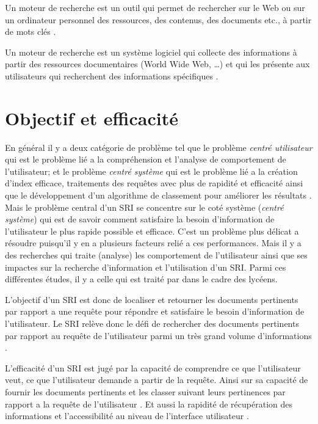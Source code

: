 \begin{definition}
	Un moteur de recherche est un outil qui permet de rechercher sur le Web ou sur un ordinateur personnel des ressources, des contenus, des documents etc., à partir de mots clés \citep{jdn-moteur-de-recherche}.
\end{definition}

\begin{definition}
	Un moteur de recherche est un système logiciel qui collecte des informations à partir des ressources documentaires (World Wide Web, \dots) et qui les présente aux utilisateurs qui recherchent des informations spécifiques \citep{mdn-search-engine}.
\end{definition}

\section{Objectif et efficacité}
En général il y a deux catégorie de problème tel que le problème \textit{centré utilisateur} qui est le problème lié a la compréhension et l'analyse de comportement de l'utilisateur; et le problème \textit{centré système} qui est le problème lié a la création d'index efficace, traitements des requêtes avec plus de rapidité et efficacité ainsi que le développement d'un algorithme de classement pour améliorer les résultats \citep{modern-ir}. Mais le problème central d'un SRI se concentre sur le coté système (\textit{centré système}) qui est de savoir comment satisfaire la besoin d'information de l'utilisateur le plus rapide possible et efficace. C'est un problème plus délicat a résoudre puisqu'il y en a plusieurs facteurs relié a ces performances. Mais il y a des recherches qui traite (analyse) les comportement de l'utilisateur ainsi que ses impactes sur la recherche d’information et l'utilisation d'un SRI. Parmi ces différentes études, il y a celle qui est traité par \citeauthor{ri-sur-le-web} \citep{ri-sur-le-web} dans le cadre des lycéens.

L'objectif d'un SRI est donc de localiser et retourner les documents pertinents par rapport a une requête pour répondre et satisfaire le besoin d'information de l'utilisateur. Le SRI relève donc le défi de rechercher des documents pertinents par rapport au requête de l'utilisateur parmi un très grand volume d'informations \citep{amelioration-ri-approche-semantique}.

L'efficacité d'un SRI est jugé par la capacité de comprendre ce que l'utilisateur veut, ce que l'utilisateur demande a partir de la requête. Ainsi sur sa capacité de fournir les documents pertinents et les classer suivant leurs pertinences par rapport a la requête de l'utilisateur \citep{vsm}. Et aussi la rapidité de récupération des informations et l'accessibilité au niveau de l'interface utilisateur \citep{ir-on-web}.

